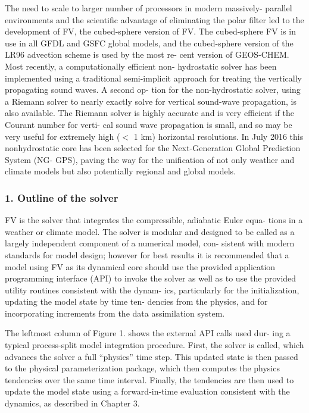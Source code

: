 The need to scale to larger number of processors in modern massively-\/ parallel environments and the scientific advantage of eliminating the polar filter led to the development of F\-V, the cubed-\/sphere version of F\-V. The cubed-\/sphere F\-V is in use in all G\-F\-D\-L and G\-S\-F\-C global models, and the cubed-\/sphere version of the L\-R96 advection scheme is used by the most re-\/ cent version of G\-E\-O\-S-\/\-C\-H\-E\-M. Most recently, a computationally efficient non-\/ hydrostatic solver has been implemented using a traditional semi-\/implicit approach for treating the vertically propagating sound waves. A second op-\/ tion for the non-\/hydrostatic solver, using a Riemann solver to nearly exactly solve for vertical sound-\/wave propagation, is also available. The Riemann solver is highly accurate and is very efficient if the Courant number for verti-\/ cal sound wave propagation is small, and so may be very useful for extremely high ($<$ 1 km) horizontal resolutions. In July 2016 this nonhydrostatic core has been selected for the Next-\/\-Generation Global Prediction System (N\-G-\/ G\-P\-S), paving the way for the unification of not only weather and climate models but also potentially regional and global models.

\subsubsection*{1. Outline of the solver}

F\-V is the solver that integrates the compressible, adiabatic Euler equa-\/ tions in a weather or climate model. The solver is modular and designed to be called as a largely independent component of a numerical model, con-\/ sistent with modern standards for model design; however for best results it is recommended that a model using F\-V as its dynamical core should use the provided application programming interface (A\-P\-I) to invoke the solver as well as to use the provided utility routines consistent with the dynam-\/ ics, particularly for the initialization, updating the model state by time ten-\/ dencies from the physics, and for incorporating increments from the data assimilation system.

The leftmost column of Figure 1. shows the external A\-P\-I calls used dur-\/ ing a typical process-\/split model integration procedure. First, the solver is called, which advances the solver a full “physics” time step. This updated state is then passed to the physical parameterization package, which then computes the physics tendencies over the same time interval. Finally, the tendencies are then used to update the model state using a forward-\/in-\/time evaluation consistent with the dynamics, as described in Chapter 3.

